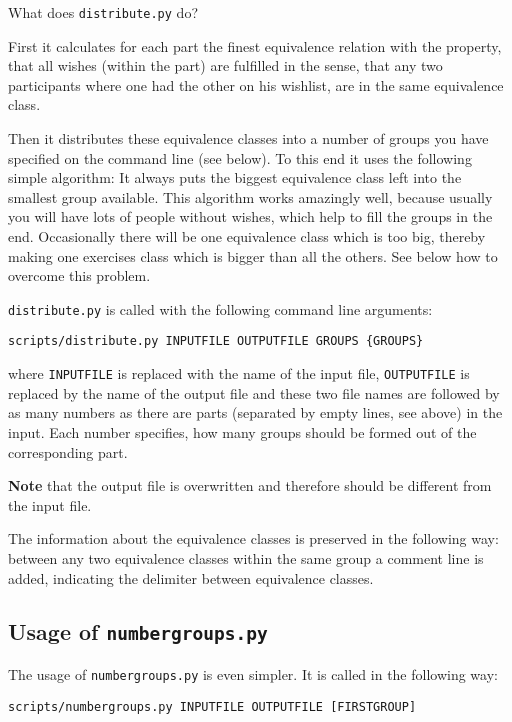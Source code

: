 \documentclass[12pt,openany,a4paper]{book}
\begin{document}
What does \texttt{distribute.py} do?

First it calculates for each part the finest equivalence relation with the
property, that all wishes (within the part) are fulfilled in the sense,
that any two participants where one had the other on his wishlist, are in
the same equivalence class.

Then it distributes these equivalence classes into a number of groups you
have specified on the command line (see below). To this end it uses the
following simple algorithm: It always puts the biggest equivalence class
left into the smallest group available. This algorithm works amazingly
well, because usually you will have lots of people without wishes, which
help to fill the groups in the end. Occasionally there will be one
equivalence class which is too big, thereby making one exercises class
which is bigger than all the others. See below how to overcome this
problem.

\texttt{distribute.py} is called with the following command line arguments:

\hspace*{5mm} \verb!scripts/distribute.py INPUTFILE OUTPUTFILE GROUPS {GROUPS}!

where \texttt{INPUTFILE} is replaced with the name of the input file,
\texttt{OUTPUTFILE} is replaced by the name of the output file and
these two file names are followed by as many numbers as there are parts
(separated by empty lines, see above) in the input. Each number specifies,
how many groups should be formed out of the corresponding part. 

\textbf{Note} that the output file is overwritten and therefore should
be different from the input file.

The information about the equivalence classes is preserved in the following
way: between any two equivalence classes within the same group a comment
line is added, indicating the delimiter between equivalence classes.

\subsection{Usage of \texttt{numbergroups.py}}

The usage of \texttt{numbergroups.py} is even simpler. It is  called in
the following way:

\hspace*{5mm} \verb!scripts/numbergroups.py INPUTFILE OUTPUTFILE [FIRSTGROUP]!
\end{document}
